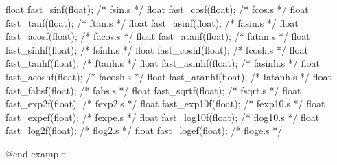  float fast_sinf(float);	/*	fsin.s */
 float fast_cosf(float);	/*	fcos.s */
 float fast_tanf(float);	/*	ftan.s */
 float fast_asinf(float);	/*	fasin.s */
 float fast_acosf(float);	/*	facos.s */
 float fast_atanf(float);	/*	fatan.s */
 float fast_sinhf(float);	/*	fsinh.s */
 float fast_coshf(float);	/*	fcosh.s */
 float fast_tanhf(float);	/*	ftanh.s */
 float fast_asinhf(float);	/*	fasinh.s */
 float fast_acoshf(float);	/*	facosh.s */
 float fast_atanhf(float);	/*	fatanh.s */
 float fast_fabsf(float);	/*	fabs.s */
 float fast_sqrtf(float);	/*	fsqrt.s */
 float fast_exp2f(float);	/*	fexp2.s */
 float fast_exp10f(float);	/*	fexp10.s */
 float fast_expef(float);	/*	fexpe.s */
 float fast_log10f(float);	/*	flog10.s */
 float fast_log2f(float);	/*	flog2.s */
 float fast_logef(float);	/*	floge.s */

@end example


